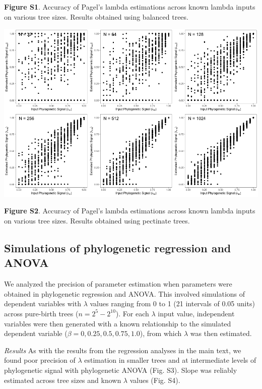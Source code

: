\documentclass[]{article}
\begin{document}
\textbf{Figure S1}. Accuracy of Pagel's lambda estimations across known
lambda inputs on various tree sizes. Results obtained using balanced
trees. \hfill\break

\includegraphics[width=0.95\linewidth]{FigS2}

\textbf{Figure S2}. Accuracy of Pagel's lambda estimations across known
lambda inputs on various tree sizes. Results obtained using pectinate
trees.

\hypertarget{simulations-of-phylogenetic-regression-and-anova}{%
\subsection{Simulations of phylogenetic regression and
ANOVA}\label{simulations-of-phylogenetic-regression-and-anova}}

We analyzed the precision of parameter estimation when parameters were
obtained in phylogenetic regression and ANOVA. This involved simulations
of dependent variables with \(\lambda\) values ranging from 0 to 1 (21
intervals of 0.05 units) across pure-birth trees (\(n=2^5 - 2^{10}\)).
For each \(\lambda\) input value, independent variables were then
generated with a known relationship to the simulated dependent variable
(\(\beta = 0, 0.25, 0.5, 0.75, 1.0\)), from which \(\lambda\) was then
estimated.

\emph{Results} As with the results from the regression analyses in the
main text, we found poor precision of \(\lambda\) estimation in smaller
trees and at intermediate levels of phylogenetic signal with
phylogenetic ANOVA (Fig. S3). Slope was reliably estimated across tree
sizes and known \(\lambda\) values (Fig. S4).
\end{document}
